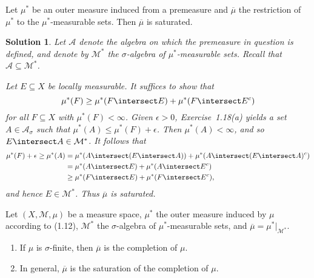 \documentclass[article, a4paper, 11pt, oneside]{memoir}
\numberwithin{equation}{chapter}
\newcommand{\calM}{\mathcal{M}}
\newcommand{\calA}{\mathcal{A}}
\theoremstyle{nonumberplain}
\newtheorem{solution}{Solution}
\begin{document}
\begin{exerciseframed*}[21]
    Let $\mu^*$ be an outer measure induced from a premeasure and $\overline\mu$ the restriction of $\mu^*$ to the $\mu^*$-measurable sets. Then $\overline\mu$ is saturated.
\end{exerciseframed*}

\begin{solution}
	Let $\calA$ denote the algebra on which the premeasure in question is defined, and denote by $\calM^*$ the $\sigma$-algebra of $\mu^*$-measurable sets. Recall that $\calA \subseteq \calM^*$.
	
	Let $E \subseteq X$ be locally measurable. It suffices to show that
	\begin{equation*}
		\mu^*(F)
        \geq \mu^*(F \intersect E) + \mu^*(F \intersect E^c)
	\end{equation*}
	for all $F \subseteq X$ with $\mu^*(F) < \infty$. Given $\epsilon   > 0$, Exercise~1.18(a) yields a set $A \in \calA_\sigma$ such that $\mu^*(A) \leq \mu^*(F) + \epsilon$. Then $\mu^*(A) < \infty$, and so $E \intersect A \in \calM^*$. It follows that
	\begin{align*}
		\mu^*(F) + \epsilon
        \geq \mu^*(A)
        &= \mu^*(A \intersect (E \intersect A))
		+ \mu^*(A \intersect (E \intersect A)^c) \\
        &= \mu^*(A \intersect E) + \mu^*(A \intersect E^c) \\
        &\geq \mu^*(F \intersect E) + \mu^*(F \intersect E^c),
	\end{align*}
	and hence $E \in \calM^*$. Thus $\overline\mu$ is saturated.
\end{solution}


\begin{exerciseframed*}[22]
    Let $(X,\calM,\mu)$ be a measure space, $\mu^*$ the outer measure induced by $\mu$ according to (1.12), $\calM^*$ the $\sigma$-algebra of $\mu^*$-measurable sets, and $\overline\mu = \mu^*|_{\calM^*}$.
    \begin{enumerate}
        \item If $\mu$ is $\sigma$-finite, then $\overline\mu$ is the completion of $\mu$.
        \item In general, $\overline\mu$ is the saturation of the completion of $\mu$.
    \end{enumerate}
\end{exerciseframed*}
\end{document}
